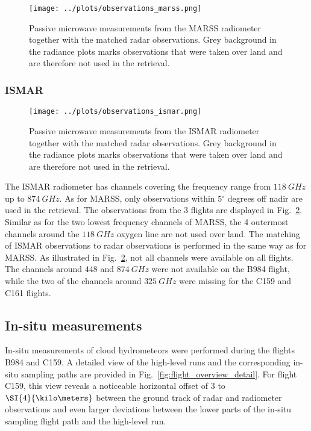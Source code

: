 \documentclass[journal abbreviation, manuscript]{copernicus}
\begin{document}
\begin{figure}[h!]
  \centering
  \texttt{[image: ../plots/observations\_marss.png]}
  \caption{
    Passive microwave measurements from the MARSS radiometer together with the
    matched radar observations. Grey background in the radiance plots marks
    observations that were taken over land and are therefore not used in
    the retrieval.
    }
  \label{fig:observations_marss}
\end{figure}


\subsubsection{ISMAR}

\begin{figure}[h!]
  \centering
  \texttt{[image: ../plots/observations\_ismar.png]}
  \caption{
    Passive microwave measurements from the ISMAR radiometer together with the
    matched radar observations. Grey background in the radiance plots marks
    observations that were taken over land and are therefore not used in
    the retrieval.
    }
  \label{fig:observations_ismar}
\end{figure}

The ISMAR radiometer has channels covering the frequency range from
$118\ \unit{GHz}$ up to $874\ \unit{GHz}$. As for MARSS, only observations
within $5\unit{^\circ}$ degrees off nadir are used in the retrieval. The
observations from the 3 flights are displayed in
Fig.~\ref{fig:observations_ismar}. Similar as for the two lowest frequency
channels of MARSS, the 4 outermost channels around the $118\ \unit{GHz}$ oxygen
line are not used over land. The matching of ISMAR observations to radar
observations is performed in the same way as for MARSS. As illustrated in
Fig.~\ref{fig:observations_ismar}, not all channels were available on all
flights. The channels around $448$ and $874\ \unit{GHz}$ were not available on
the B984 flight, while the two of the channels around $325\ \unit{GHz}$ were
missing for the C159 and C161 flights.


\subsection{In-situ measurements}
\label{sec:in_situ}

In-situ measurements of cloud hydrometeors were performed during the flights
B984 and C159. A detailed view of the high-level runs and the corresponding
in-situ sampling paths are provided in Fig.~\ref{fig:flight_overview_detail}.
For flight C159, this view reveals a noticeable horizontal offset of $3$ to
$\SI{4}{\kilo \meters}$ between the ground track of radar and radiometer
observations and even larger deviations between the lower parts of the
in-situ sampling flight path and the high-level run.
\end{document}
